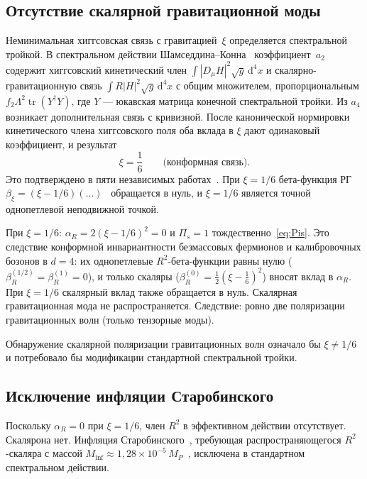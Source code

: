 \documentclass[12pt,a4paper]{article}
\theoremstyle{plain}
\theoremstyle{definition}
\theoremstyle{remark}
\newcommand{\dd}{\mathrm{d}}
\newcommand{\tr}{\operatorname{tr}}
\begin{document}
\subsection{Отсутствие скалярной гравитационной моды}
\label{sec:scalar}

Неминимальная хиггсовская связь с гравитацией~$\xi$ определяется
спектральной тройкой. В спектральном действии
Шамседдина--Конна~\cite{CCM:2006} коэффициент~$a_2$ содержит
хиггсовский кинетический член $\int |D_\mu H|^2 \sqrt{g}\,\dd^4 x$
и скалярно-гравитационную связь $\int R|H|^2 \sqrt{g}\,\dd^4 x$
с общим множителем, пропорциональным $f_2 \Lambda^2
\tr(Y^\dagger Y)$, где $Y$ --- юкавская матрица конечной
спектральной тройки. Из $a_4$ возникает дополнительная связь с
кривизной. После канонической нормировки кинетического члена
хиггсовского поля оба вклада в $\xi$ дают одинаковый
коэффициент, и
результат~\cite{CCM:2006,CC:2010,CCS:2013,vS:2015,DLM:2014}
\begin{equation}
  \xi = \frac{1}{6}\qquad\text{(конформная связь)}.
\end{equation}
Это подтверждено в пяти независимых
работах~\cite{CCM:2006,CC:2010,CCS:2013,vS:2015,DLM:2014}.
При $\xi = 1/6$ бета-функция РГ
$\beta_\xi = (\xi - 1/6)(...)$~\cite{ParkerToms:2009}
обращается в нуль, и $\xi = 1/6$ является точной однопетлевой
неподвижной точкой.

При $\xi = 1/6$: $\alpha_R = 2(\xi - 1/6)^2 = 0$ и $\Pi_s = 1$
тождественно~\eqref{eq:Pis}. Это следствие конформной инвариантности
безмассовых фермионов и калибровочных бозонов в $d = 4$: их
однопетлевые $R^2$-бета-функции равны нулю ($\beta_R^{(1/2)} =
\beta_R^{(1)} = 0$), и только скаляры ($\beta_R^{(0)} =
\frac{1}{2}(\xi - \frac{1}{6})^2$) вносят вклад в $\alpha_R$.
При $\xi = 1/6$ скалярный вклад также обращается в нуль.
Скалярная гравитационная мода не распространяется.
Следствие: ровно две поляризации гравитационных волн
(только тензорные моды).

Обнаружение скалярной поляризации гравитационных волн означало бы
$\xi \neq 1/6$ и потребовало бы модификации стандартной спектральной
тройки.

\subsection{Исключение инфляции Старобинского}
\label{sec:inflation}

Поскольку $\alpha_R = 0$ при $\xi = 1/6$, член $R^2$ в
эффективном действии отсутствует. Скалярона нет. Инфляция
Старобинского~\cite{Starobinsky:1980}, требующая распространяющегося
$R^2$-скаляра с массой $M_{\mathrm{inf}} \approx 1{,}28 \times
10^{-5}\, M_P$~\cite{Planck:2018}, исключена в стандартном
спектральном действии.
\end{document}
